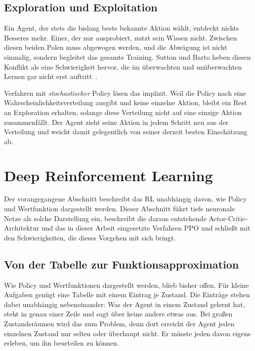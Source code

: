 \subsection{Exploration und Exploitation}

Ein Agent, der stets die bislang beste bekannte Aktion wählt, entdeckt nichts
Besseres mehr. Einer, der nur ausprobiert, nutzt sein Wissen nicht. Zwischen
diesen beiden Polen muss abgewogen werden, und die Abwägung ist nicht einmalig,
sondern begleitet das gesamte Training. Sutton und Barto heben diesen Konflikt
als eine Schwierigkeit hervor, die im überwachten und unüberwachten Lernen gar
nicht erst auftritt~\cite[Abschn.~1.1]{suttonbarto2018}.

Verfahren mit \emph{stochastischer} Policy lösen das implizit. Weil die Policy
nach  eine Wahrscheinlichkeitsverteilung ausgibt und keine
einzelne Aktion, bleibt ein Rest an Exploration erhalten, solange diese
Verteilung nicht auf eine einzige Aktion zusammenfällt. Der Agent zieht seine
Aktion in jedem Schritt neu aus der Verteilung und weicht damit gelegentlich von
seiner derzeit besten Einschätzung ab.

\section{Deep Reinforcement Learning}
\label{sec:drl}

Der vorangegangene Abschnitt beschreibt das \ac{RL} unabhängig davon, wie
Policy und Wertfunktion dargestellt werden. Dieser Abschnitt führt tiefe
neuronale Netze als solche Darstellung ein, beschreibt die daraus
entstehende Actor-Critic-Architektur und das in dieser Arbeit eingesetzte
Verfahren \ac{PPO} und schließt mit den Schwierigkeiten, die dieses
Vorgehen mit sich bringt.

\subsection{Von der Tabelle zur Funktionsapproximation}
\label{sec:funktionsapproximation}

Wie Policy und Wertfunktionen dargestellt werden, blieb bisher offen. Für kleine
Aufgaben genügt eine Tabelle mit einem Eintrag je Zustand. Die Einträge stehen
dabei unabhängig nebeneinander: Was der Agent in einem Zustand gelernt hat,
steht in genau einer Zeile und sagt über keine andere etwas aus. Bei großen
Zustandsräumen wird das zum Problem, denn dort erreicht der Agent jeden
einzelnen Zustand nur selten oder überhaupt nicht. Er müsste jeden davon eigens
erleben, um ihn beurteilen zu können.

